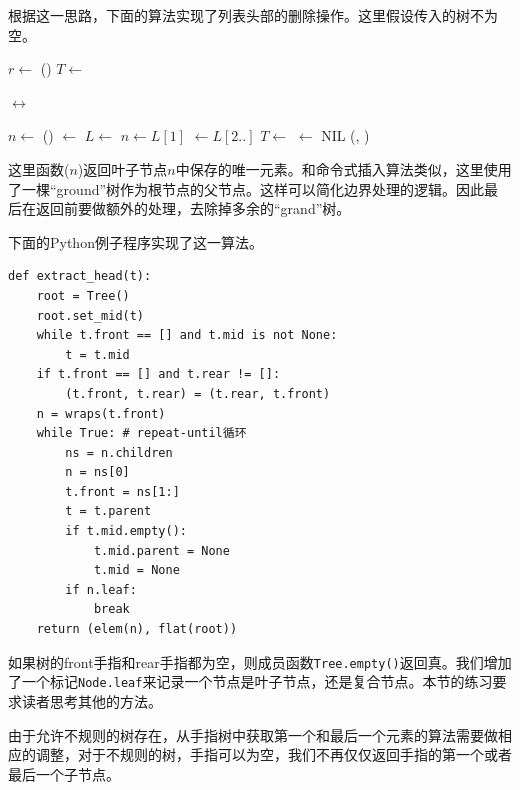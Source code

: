 \documentclass[b5paper]{ctexart}
\begin{document}
根据这一思路，下面的算法实现了列表头部的删除操作。这里假设传入的树不为空。

\begin{algorithmic}
  \State $r \gets$ ()
  \State {}
    \State $T \gets$ 
  \EndWhile

    \State {}  $\leftrightarrow$ 
  \EndIf

  \State $n \gets $ ()
  \State {} $\gets$ 
  \Repeat
    \State $L \gets$  
    \State $n \gets L[1]$ 
    \State {} $\gets L[2..]$ 
    \State $T \gets $ 
      \State {} $\gets$ NIL
    \EndIf
  \State \Return (, )
\EndFunction
\end{algorithmic}

这里函数($n$)返回叶子节点$n$中保存的唯一元素。和命令式插入算法类似，这里使用了一棵“ground”树作为根节点的父节点。这样可以简化边界处理的逻辑。因此最后在返回前要做额外的处理，去除掉多余的“grand”树。

下面的Python例子程序实现了这一算法。

\lstset{language=Python}
\begin{lstlisting}
def extract_head(t):
    root = Tree()
    root.set_mid(t)
    while t.front == [] and t.mid is not None:
        t = t.mid
    if t.front == [] and t.rear != []:
        (t.front, t.rear) = (t.rear, t.front)
    n = wraps(t.front)
    while True: # repeat-until循环
        ns = n.children
        n = ns[0]
        t.front = ns[1:]
        t = t.parent
        if t.mid.empty():
            t.mid.parent = None
            t.mid = None
        if n.leaf:
            break
    return (elem(n), flat(root))
\end{lstlisting}

如果树的front手指和rear手指都为空，则成员函数\texttt{Tree.empty()}返回真。我们增加了一个标记\texttt{Node.leaf}来记录一个节点是叶子节点，还是复合节点。本节的练习要求读者思考其他的方法。

由于允许不规则的树存在，从手指树中获取第一个和最后一个元素的算法需要做相应的调整，对于不规则的树，手指可以为空，我们不再仅仅返回手指的第一个或者最后一个子节点。
\end{document}
